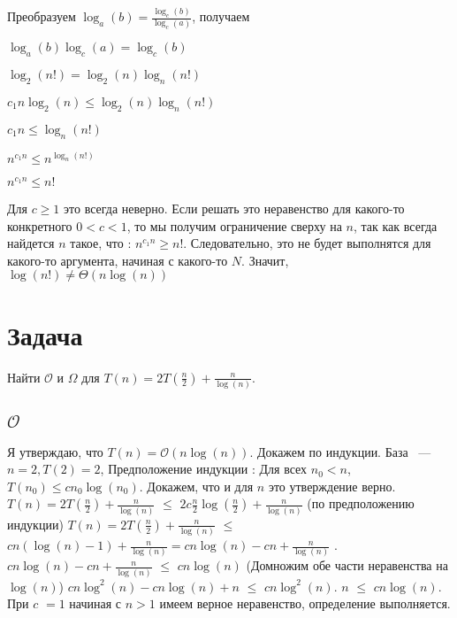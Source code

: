 \documentclass{article}
\begin{document}
Преобразуем	$\log_{a}(b) = \frac{\log_{c}(b)}{\log_{c}(a)}$, получаем
\begin{center} $\log_{a}(b)\log_{c}(a) = \log_{c}(b)$
	
$\log_{2}(n!) = \log_{2}(n)\log_{n}(n!)$

$c_{1}n\log_{2}(n) \leq \log_{2}(n)\log_{n}(n!)$

$c_{1}n \leq \log_{n}(n!)$

$n^{c_{1}n} \leq n^{\log_{n}(n!)}$

$n^{c_{1}n} \leq n!$
\end{center}
Для $c \geq 1$ это всегда неверно.
\newline
Если решать это неравенство для какого-то конкретного $  0 < c < 1$, то мы получим ограничение сверху на $n$, так как всегда найдется $n$ такое, что : $n^{c_{1}n} \geq n!$. Следовательно, это не будет выполнятся для какого-то аргумента, начиная с какого-то $N$. Значит, $\log(n!) \neq \Theta(n\log(n))$


\section{Задача }

Найти $\mathcal{O}$  и  $\Omega$ для $T(n) = 2T(\frac{n}{2}) + \frac{n}{\log(n)}$.
\subsection{$\mathcal{O}$}
Я утверждаю, что $T(n) = \mathcal{O}(n\log(n))$. Докажем по индукции. База ~--- $n = 2, T(2) = 2$, 
\newline
Предположение индукции : Для всех $n_{0} < n$, $T(n_{0}) \leq cn_{0}\log(n_{0})$. Докажем, что и для $n$ это утверждение верно.
\newline
$T(n) = 2T(\frac{n}{2}) + \frac{n}{\log(n)}$ $\leq$ $2c\frac{n}{2}\log(\frac{n}{2}) + \frac{n}{\log(n)}$  (по предположению индукции)
\newline
$T(n) = 2T(\frac{n}{2}) + \frac{n}{\log(n)}$ $\leq$ $cn(\log(n) - 1) + \frac{n}{\log(n)} = cn\log(n) - cn + \frac{n}{\log(n)}$ .
\newline
$cn\log(n) - cn + \frac{n}{\log(n)}$ $\leq$ $cn\log(n)$ (Домножим обе части неравенства на $\log(n)$)
$cn\log^{2}(n) - cn\log(n) + n$ $\leq$ $cn\log^{2}(n)$.
\newline
$n$ $\leq$ $cn\log(n)$. 
При $c$ $= 1$ начиная с $n > 1$ имеем верное неравенство, определение выполняется. %
\end{document}
